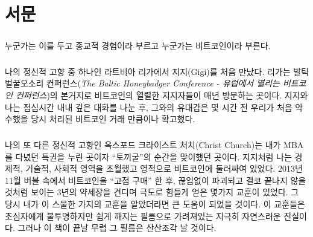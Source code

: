 \chapter*{서문}

\paragraph{}
누군가는 이를 두고 종교적 경험이라 부르고  
누군가는 비트코인이라 부른다.

\paragraph{}
나의 정신적 고향 중 하나인 라트비아 리가에서 지지(Gigi)를 처음 만났다. 리가는 발틱 벌꿀오소리 컨퍼런스(\textit{The Baltic Honeybadger Conference - 유럽에서 열리는 비트코인 컨퍼런스})의 본거지로 비트코인의 열렬한 지지자들이 매년 방문하는 곳이다. 
지지와 나는 점심시간 내내 깊은 대화를 나눈 후, 그와의 유대감은 몇 시간 전 우리가 처음 악수했을 당시 처리된 비트코인 거래 만큼이나 확고했다. 


\paragraph{}
나의 또 다른 정신적 고향인 옥스포드 크라이스트 처치(Christ Church)는 내가 MBA를 다녔던 특권을 누린 곳이자 \enquote{토끼굴}의 순간을 맞이했던 곳이다.
지지처럼 나는 경제적, 기술적, 사회적 영역을 초월했고 영적으로 비트코인에 둘러싸여 있었다. 
2013년 11월 버블 속에서 비트코인을 \enquote{고점 구매} 한 후, 끊임없이 파괴되고 결코 끝나지 않을 것처럼 보이는 3년의 약세장을 견디며 극도로 힘들게 얻은 몇가지 교훈이 있었다.
그 당시 내가 이 스물한 가지의 교훈을 알았더라면 큰 도움이 되었을 것이다. 
이 교훈들은 초심자에게 불투명하지만 쉽게 깨지는 필름으로 가려져있는 지극히 자연스러운 진실이다. 그러나 이 책이 끝날 무렵 그 필름은 산산조각 날 것이다.


